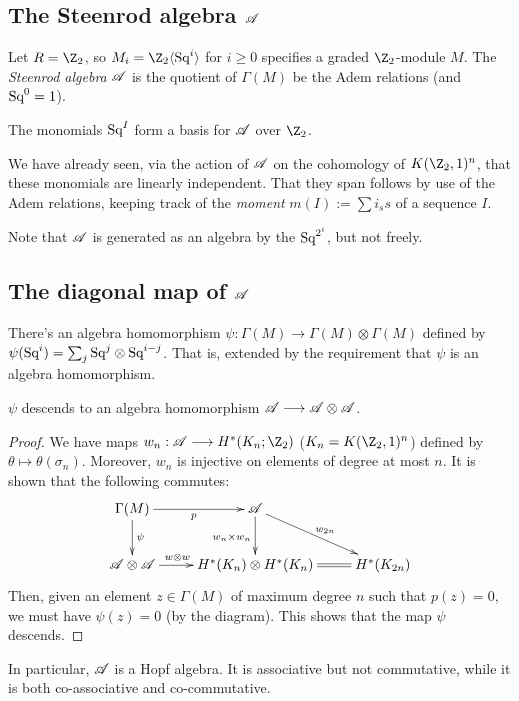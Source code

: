 \documentclass[11pt]{article}
\begin{document}
\subsection{The Steenrod algebra \texorpdfstring{$\mathscr{A}$}{A}}
Let $R=\Z_2$, so $M_i=\Z_2\langle\Squ^i\rangle$ for $i\geq0$ specifies a graded $\Z_2$-module $M$. The \emph{Steenrod algebra} $\mathscr{A}$ is the quotient of $\Gamma(M)$ be the Adem relations (and $\textup{Sq}^0=1$).
\begin{thm*}
The monomials $\textup{Sq}^I$ form a basis for $\mathscr{A}$ over $\Z_2$.
\end{thm*}
We have already seen, via the action of $\mathscr{A}$ on the cohomology of $K(\Z_2,1)^n$, that these monomials are linearly independent. That they span follows by use of the Adem relations, keeping track of the \emph{moment} $m(I):=\sum i_ss$ of a sequence $I$.

Note that $\mathscr{A}$ is generated as an algebra by the $\textup{Sq}^{2^i}$, but not freely.
\setcounter{subsection}{3}
\subsection{The diagonal map of \texorpdfstring{$\mathscr{A}$}{A}}
There's an algebra homomorphism $\psi:\Gamma(M)\to\Gamma(M)\otimes\Gamma(M)$ defined by $\psi(\textup{Sq}^i)=\sum_j \textup{Sq}^j\otimes\textup{Sq}^{i-j}$. That is, extended by the requirement that $\psi$ is an algebra homomorphism.
\begin{thm*}
$\psi$ descends to an algebra homomorphism $\mathscr{A}\longrightarrow\mathscr{A}\otimes\mathscr{A}$.
\end{thm*}
\begin{proof}
We have maps $w_n:\Steen\to H^*(K_n;\Z_2)$ ($K_n=K(\Z_2,1)^n$) defined by $\theta\mapsto\theta(\sigma_n)$. Moreover, $w_n$ is injective on elements of degree at most $n$. It is shown  that the following commutes:
\[\xymatrix{
\Gamma(M)\ar[r]_p\ar[d]^\psi&\Steen\ar[d]_{w_n\times w_n}\ar[rd]^{w_{2n}}\\
\Steen\otimes\Steen\ar[r]^{w\otimes w\qquad \ }&H^*(K_n)\otimes H^*(K_n)\ar@{=}[r]&H^*(K_{2n})
}\]
Then, given an element $z\in\Gamma(M)$ of maximum degree $n$ such that $p(z)=0$, we must have $\psi(z)=0$ (by the diagram). This shows that the map $\psi$ descends.%
\end{proof}
In particular, $\mathscr{A}$ is a Hopf algebra. It is associative but not commutative, while it is both co-associative and co-commutative.
\end{document}

